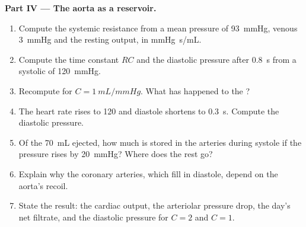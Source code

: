 \begin{problem}
\medskip
\noindent\textbf{Part IV --- The aorta as a reservoir.}
\begin{enumerate}[resume]
  \item Compute the systemic resistance from a mean pressure of
        \qty{93}{mmHg}, venous \qty{3}{mmHg} and the resting output,
        in \unit{mmHg.s/mL}.
  \item Compute the time constant $RC$ and the diastolic pressure
        after \qty{0.8}{s} from a systolic of \qty{120}{mmHg}.
  \item Recompute for $C = \qty{1}{mL/mmHg}$. What has happened to
        the ?
  \item The heart rate rises to \num{120} and diastole shortens to
        \qty{0.3}{s}. Compute the diastolic pressure.
  \item Of the \qty{70}{mL} ejected, how much is stored in the
        arteries during systole if the pressure rises by
        \qty{20}{mmHg}? Where does the rest go?
  \item Explain why the coronary arteries, which fill in diastole,
        depend on the aorta's recoil.
  \item State the result: the cardiac output, the arteriolar
        pressure drop, the day's net filtrate, and the diastolic
        pressure for $C = 2$ and $C = 1$.
\end{enumerate}
\end{problem}
